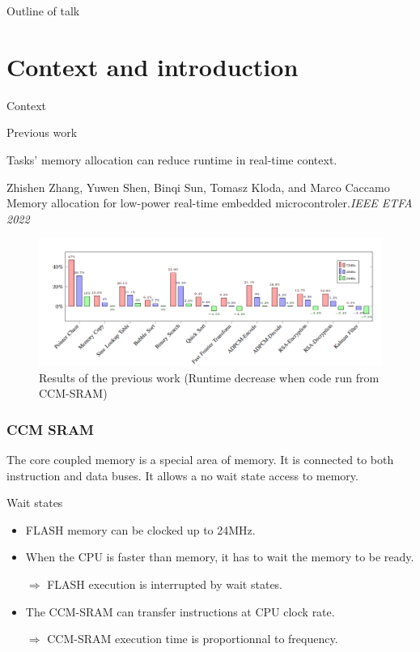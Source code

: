 \documentclass[
	11pt, %
]{beamer}
\begin{document}
\begin{frame}{Outline of talk}
	\tableofcontents
\end{frame}

\section{Context and introduction}

\begin{frame}{Context}
	\begin{block}{Previous work}


		
		Tasks' memory allocation can reduce runtime in real-time context.
			\begin{thebibliography}{10}
				{\tiny
				\bibitem{} Zhishen Zhang, Yuwen Shen, Binqi Sun, Tomasz Kloda, and Marco Caccamo
				\newblock Memory allocation for low-power real-time embedded microcontroler.{\em{IEEE ETFA 2022}}
				}
			\end{thebibliography}
	\end{block}
	\begin{figure}
		\centering
		\includegraphics[scale=0.5]{images/boost.png}
		\caption{Results of the previous work (Runtime decrease when code run from CCM-SRAM)}
	\end{figure}
\end{frame}





\begin{frame}
    \frametitle{CCM SRAM}
	\begin{center}
		
	\end{center}
    The core coupled memory is a special area of memory. 
    It is connected to both instruction and data buses.
    It allows a no wait state access to memory. 
\end{frame}

\begin{frame}{Wait states}
	\begin{itemize}
	\item FLASH memory can be clocked up to 24MHz.
	\item When the CPU is faster than memory, it has to wait the memory to be ready.
	
	$\Rightarrow$ FLASH execution is interrupted by wait states. 
	\item The CCM-SRAM can transfer instructions at CPU clock rate.
	
	$\Rightarrow$ CCM-SRAM execution time is proportionnal to frequency. 
	\end{itemize} 
\end{frame}
\end{document}
